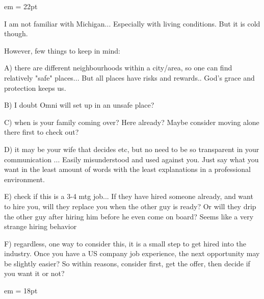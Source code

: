 

 em
\FFrk \baselineskip = 22pt


I am not familiar with Michigan... Especially with living conditions. But it is cold though.

However, few things to keep in mind:

A) there are different neighbourhoods within a city/area, so one can find relatively "safe" places... But all places have risks and rewards.. God's grace and protection keeps us.

B) I doubt Omni will set up in an unsafe place?

C) when is your family coming over? Here already? Maybe consider moving alone there first to check out?

D) it may be your wife that decides etc, but no need to be so transparent in your communication ... Easily misunderstood and used against you. Just say what you want in the least amount of words with the least explanations in a professional environment.

E) check if this is a 3-4 mtg job... If they have hired someone already, and want to hire you, will they replace you when the other guy is ready? Or will they drip the other guy after hiring him before he even come on board? Seems like a very strange hiring behavior

F) regardless, one way to consider this, it is a small step to get hired into the industry. Once you have a US company job experience, the next opportunity may be slightly easier? So within reasons, consider first, get the offer, then decide if you want it or not?

\vfil
\break

 em
\FFrj \baselineskip = 18pt

